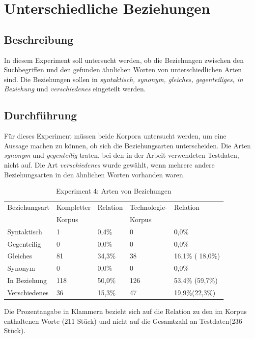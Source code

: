 \documentclass[12pt,a4paper]{report}
\begin{document}
		
	\newpage
	\section{Unterschiedliche Beziehungen}
		\subsection{Beschreibung}
		In diesem Experiment soll untersucht werden, ob die Beziehungen zwischen den Suchbegriffen und den gefunden ähnlichen Worten von unterschiedlichen Arten sind. Die Beziehungen sollen in \textit{syntaktisch, synonym, gleiches, gegenteiliges, in Beziehung} und \textit{verschiedenes} eingeteilt werden.
		\subsection{Durchführung}
		Für dieses Experiment müssen beide Korpora untersucht werden, um eine Aussage machen zu können, ob sich die Beziehungsarten unterscheiden. Die Arten \textit{synonym} und \textit{gegenteilig} traten, bei den in der Arbeit verwendeten Testdaten, nicht auf. Die Art \textit{verschiedenes} wurde gewählt, wenn mehrere andere Beziehungsarten in den ähnlichen Worten vorhanden waren.
		
\begin{table}[h]
\caption{Experiment 4: Arten von Beziehungen}
\begin{center}
\begin{tabular}{|l||l|l||l|l|}
\hline
Beziehungsart	& Kompletter	& Relation & Technologie-  & Relation\\
 				& Korpus 		& 		   & Korpus		& \\

\hline
 Syntaktisch & 1 &  0,4\%	& 0 & 0,0\% \\
 \hline
 Gegenteilig & 0 & 0,0\% 	& 0 & 0,0\% \\
 \hline
 Gleiches & 81 & 34,3\% 	& 38 & 16,1\% ( 18,0\%) \\
 \hline
 Synonym & 0 & 0,0\% 	& 0 & 0,0\% \\
 \hline
 In Beziehung & 118 & 50,0\% 	& 126 & 53,4\% (59,7\%)\\
 \hline
 Verschiedenes & 36 & 15,3\% 	& 47 & 19,9\%(22,3\%) \\
 \hline
 
\end{tabular}
\end{center}
\end{table}
		
		Die Prozentangabe in Klammern bezieht sich auf die Relation zu den im Korpus enthaltenen Worte (211 Stück) und nicht auf die Gesamtzahl an Testdaten(236 Stück).\\
		
\end{document}
